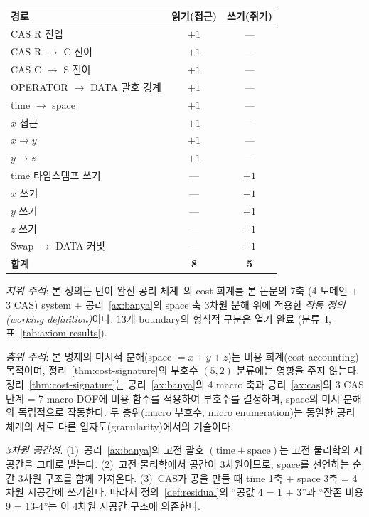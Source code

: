 \documentclass[entropy,article,submit,pdftex,oneauthor]{Definitions/mdpi}
\begin{document}
\begin{Definition}
\begin{center}
\small
\begin{tabular}{lcc}
\toprule
\textbf{경로} & \textbf{읽기(접근)} & \textbf{쓰기(쥐기)} \\
\midrule
CAS R 진입 & $+1$ & --- \\
CAS R $\to$ C 전이 & $+1$ & --- \\
CAS C $\to$ S 전이 & $+1$ & --- \\
OPERATOR $\to$ DATA 괄호 경계 & $+1$ & --- \\
time $\to$ space & $+1$ & --- \\
$x$ 접근 & $+1$ & --- \\
$x \to y$ & $+1$ & --- \\
$y \to z$ & $+1$ & --- \\
time 타임스탬프 쓰기 & --- & $+1$ \\
$x$ 쓰기 & --- & $+1$ \\
$y$ 쓰기 & --- & $+1$ \\
$z$ 쓰기 & --- & $+1$ \\
Swap $\to$ DATA 커밋 & --- & $+1$ \\
\midrule
\textbf{합계} & \textbf{8} & \textbf{5} \\
\bottomrule
\end{tabular}
\end{center}
\textit{지위 주석}: 본 정의는 반야 완전 공리 체계~\cite{han2026}의 cost 회계를 본 논문의 7축 (4 도메인 + 3 CAS) system + 공리~\ref{ax:banya}의 space 축 3차원 분해 위에 적용한 \emph{작동 정의(working definition)}이다. 13개 boundary의 형식적 구분은 열거 완료 (분류~I, 표~\ref{tab:axiom-results}).
\end{Definition}

\emph{층위 주석}: 본 명제의 미시적 분해(space $= x + y + z$)는 비용 회계(cost accounting) 목적이며, 정리~\ref{thm:cost-signature}의 부호수 $(5,2)$ 분류에는 영향을 주지 않는다. 정리~\ref{thm:cost-signature}는 공리~\ref{ax:banya}의 4 macro 축과 공리~\ref{ax:cas}의 3 CAS 단계 = 7 macro DOF에 비용 함수를 적용하여 부호수를 결정하며, space의 미시 분해와 독립적으로 작동한다. 두 층위(macro 부호수, micro enumeration)는 동일한 공리 체계의 서로 다른 입자도(granularity)에서의 기술이다.

\emph{3차원 공간성}. (1)~공리~\ref{ax:banya}의 고전 괄호 $(\mathrm{time} + \mathrm{space})$는 고전 물리학의 시공간을 그대로 받는다. (2)~고전 물리학에서 공간이 3차원이므로, space를 선언하는 순간 3차원 구조를 함께 가져온다. (3)~CAS가 공을 만들 때 time 1축 + space 3축 = 4차원 시공간에 쓰기한다. 따라서 정의~\ref{def:residual}의 ``공값 4 = 1 + 3''과 ``잔존 비용 9 = 13-4''는 이 4차원 시공간 구조에 의존한다.
\end{document}
